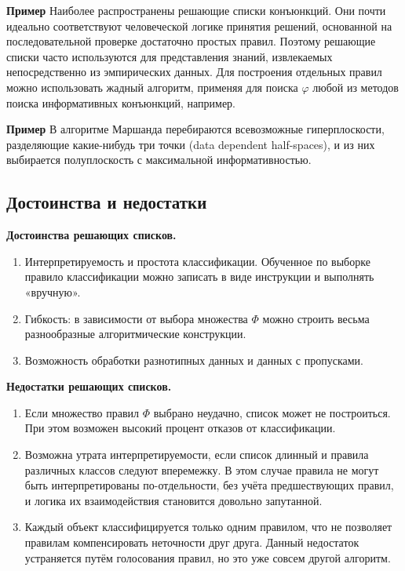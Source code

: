\textbf{Пример} Наиболее распространены решающие списки конъюнкций. Они почти
идеально соответствуют человеческой логике принятия решений, основанной на последовательной проверке достаточно простых правил. Поэтому решающие списки
часто используются для представления знаний, извлекаемых непосредственно из эмпирических данных. Для построения отдельных правил можно использовать жадный алгоритм, применяя для поиска $\varphi$ любой из методов поиска информативных конъюнкций,
например.

\textbf{Пример} В алгоритме Маршанда перебираются всевозможные гиперплоскости, разделяющие какие-нибудь три точки (data dependent half-spaces), и из них выбирается полуплоскость с максимальной информативностью.

\subsection{Достоинства и недостатки}

\textbf{Достоинства решающих списков.}
\begin{enumerate}
    \item Интерпретируемость и простота классификации. Обученное по выборке правило классификации можно записать в виде инструкции и выполнять «вручную».
    \item Гибкость: в зависимости от выбора множества $\Phi$ можно строить весьма разнообразные алгоритмические конструкции.
    \item Возможность обработки разнотипных данных и данных с пропусками.
\end{enumerate}

\textbf{Недостатки решающих списков.}
\begin{enumerate}
    \item Если множество правил $\Phi$ выбрано неудачно, список может не построиться. При этом возможен высокий процент отказов от классификации.
    \item Возможна утрата интерпретируемости, если список длинный и правила различных классов следуют вперемежку. В этом случае правила не могут быть
          интерпретированы по-отдельности, без учёта предшествующих правил, и логика их взаимодействия становится довольно запутанной.
    \item Каждый объект классифицируется только одним правилом, что не позволяет
          правилам компенсировать неточности друг друга. Данный недостаток устраняется путём голосования правил, но это уже совсем другой алгоритм.
\end{enumerate}

